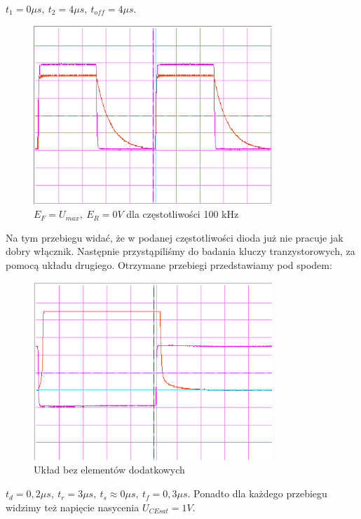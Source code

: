\documentclass[a4paper,11pt]{article}
\begin{document}
\(t_1 = 0 \mu s,\ t_2 = 4 \mu s,\ t_{off} = 4 \mu s \).

\begin{figure} [H]
  \begin{center}
    \includegraphics[width = 9cm]{../Obrazki_i_tekst/obrobione/32sciety.png}
    \caption{\( E_F = U_{max}, \ E_R = 0V \) dla częstotliwości 100 kHz }
  \end{center}
\end{figure}

Na tym przebiegu widać, że w podanej częstotliwości dioda już nie pracuje jak dobry włącznik.
\newline
\newline
Następnie przystąpiliśmy do badania kluczy tranzystorowych, za pomocą układu drugiego. 
Otrzymane przebiegi przedstawiamy pod spodem: 
\begin{figure} [H]
  \begin{center}
    \includegraphics[width = 9cm]{../Obrazki_i_tekst/obrobione/II1ciety.png}
    \caption{Układ bez elementów dodatkowych }
  \end{center}
\end{figure}
\(t_d = 0,2 \mu s,\ t_r = 3 \mu s,\ t_{s} \approx 0 \mu s,\ t_{f} = 0,3 \mu s \).
Ponadto dla każdego przebiegu widzimy też napięcie nasycenia $ U_{CEsat} = 1V $. 
\end{document}
